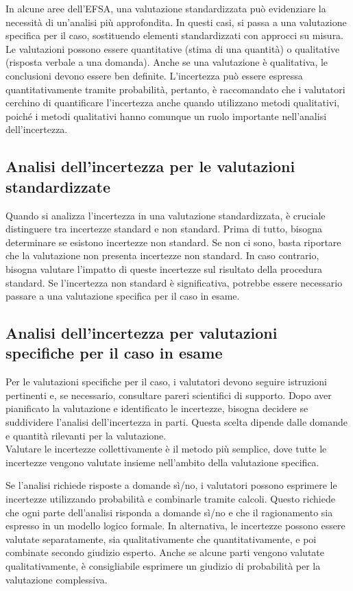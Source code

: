 In alcune aree dell'EFSA, una valutazione standardizzata può evidenziare la necessità di un'analisi più approfondita. In questi casi, si passa a una valutazione specifica per il caso, sostituendo elementi standardizzati con approcci su misura.
Le valutazioni possono essere quantitative (stima di una quantità) o qualitative (risposta verbale a una domanda). Anche se una valutazione è qualitativa, le conclusioni devono essere ben definite. L'incertezza può essere espressa quantitativamente tramite probabilità, pertanto, è raccomandato che i valutatori cerchino di quantificare l'incertezza anche quando utilizzano metodi qualitativi, poiché i metodi qualitativi hanno comunque un ruolo importante nell'analisi dell'incertezza.\\

\subsection{Analisi dell'incertezza per le valutazioni standardizzate}
Quando si analizza l'incertezza in una valutazione standardizzata, è cruciale distinguere tra incertezze standard e non standard. Prima di tutto, bisogna determinare se esistono incertezze non standard. Se non ci sono, basta riportare che la valutazione non presenta incertezze non standard. In caso contrario, bisogna valutare l'impatto di queste incertezze sul risultato della procedura standard. Se l'incertezza non standard è significativa, potrebbe essere necessario passare a una valutazione specifica per il caso in esame.\\

\subsection{Analisi dell'incertezza per valutazioni specifiche per il caso in esame}

Per le valutazioni specifiche per il caso, i valutatori devono seguire istruzioni pertinenti e, se necessario, consultare pareri scientifici di supporto. Dopo aver pianificato la valutazione e identificato le incertezze, bisogna decidere se suddividere l'analisi dell'incertezza in parti. Questa scelta dipende dalle domande e quantità rilevanti per la valutazione. \\
Valutare le incertezze collettivamente è il metodo più semplice, dove tutte le incertezze vengono valutate insieme nell'ambito della valutazione specifica.

Se l'analisi richiede risposte a domande sì/no, i valutatori possono esprimere le incertezze utilizzando probabilità e combinarle tramite calcoli. Questo richiede che ogni parte dell'analisi risponda a domande sì/no e che il ragionamento sia espresso in un modello logico formale. In alternativa, le incertezze possono essere valutate separatamente, sia qualitativamente che quantitativamente, e poi combinate secondo giudizio esperto. Anche se alcune parti vengono valutate qualitativamente, è consigliabile esprimere un giudizio di probabilità per la valutazione complessiva.\\

